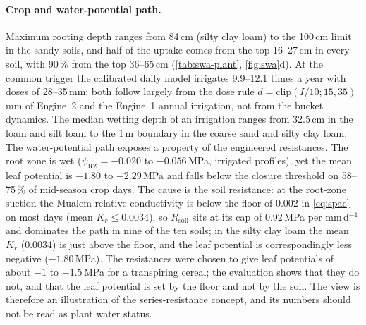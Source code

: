 \documentclass[preprint,12pt]{elsarticle}
\begin{document}
\paragraph{Crop and water-potential path.} Maximum rooting depth ranges from 84\,cm (silty clay loam) to the 100\,cm limit in the sandy soils, and half of the uptake comes from the top 16--27\,cm in every soil, with 90\,\% from the top 36--65\,cm (\cref{tab:swa-plant}, \cref{fig:swa}d). At the common trigger the calibrated daily model irrigates 9.9--12.1 times a year with doses of 28--35\,mm; both follow largely from the dose rule $d=\mathrm{clip}(I/10;15,35)$\,mm of Engine~2 and the Engine~1 annual irrigation, not from the bucket dynamics. The median wetting depth of an irrigation ranges from 32.5\,cm in the loam and silt loam to the 1\,m boundary in the coarse sand and silty clay loam. The water-potential path exposes a property of the engineered resistances. The root zone is wet ($\psi_{\mathrm{RZ}}=-0.020$ to $-0.056$\,MPa, irrigated profiles), yet the mean leaf potential is $-1.80$ to $-2.29$\,MPa and falls below the closure threshold on 58--75\,\% of mid-season crop days. The cause is the soil resistance: at the root-zone suction the Mualem relative conductivity is below the floor of $0.002$ in \cref{eq:spac} on most days (mean $K_r\le0.0034$), so $R_{\mathrm{soil}}$ sits at its cap of 0.92\,MPa per mm\,d$^{-1}$ and dominates the path in nine of the ten soils; in the silty clay loam the mean $K_r$ (0.0034) is just above the floor, and the leaf potential is correspondingly less negative ($-1.80$\,MPa). The resistances were chosen to give leaf potentials of about $-1$ to $-1.5$\,MPa for a transpiring cereal; the evaluation shows that they do not, and that the leaf potential is set by the floor and not by the soil. The view is therefore an illustration of the series-resistance concept, and its numbers should not be read as plant water status.
\end{document}
